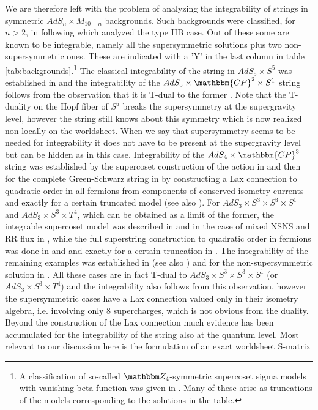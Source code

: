 \documentclass[a4paper,11pt]{article}
\begin{document}
We are therefore left with the problem of analyzing the integrability of strings in symmetric $AdS_n\times M_{10-n}$ backgrounds. Such backgrounds were classified, for $n>2$, in \cite{Wulff:2017zbl} following \cite{Figueroa-OFarrill:2012whx} which analyzed the type IIB case. Out of these some are known to be integrable, namely all the supersymmetric solutions plus two non-supersymmetric ones. These are indicated with a 'Y' in the last column in table \ref{tab:backgrounds}.\footnote{A classification of so-called $\mathbbm Z_4$-symmetric supercoset sigma models with vanishing beta-function was given in \cite{Zarembo:2010sg}. Many of these arise as truncations of the models corresponding to the solutions in the table.} The classical integrability of the string in $AdS_5\times S^5$ was established in \cite{Bena:2003wd} and the integrability of the $AdS_5\times\mathbbm{CP}^2\times S^1$ string follows from the observation that it is T-dual to the former \cite{Duff:1998us}. Note that the T-duality on the Hopf fiber of $S^5$ breaks the supersymmetry at the supergravity level, however the string still knows about this symmetry which is now realized non-locally on the worldsheet. When we say that supersymmetry seems to be needed for integrability it does not have to be present at the supergravity level but can be hidden as in this case. Integrability of the $AdS_4\times\mathbbm{CP}^3$ string was established by the supercoset construction of the action in \cite{Arutyunov:2008if,Stefanski:2008ik} and then for the complete Green-Schwarz string \cite{Gomis:2008jt} in \cite{Sorokin:2010wn} by constructing a Lax connection to quadratic order in all fermions from components of conserved isometry currents and exactly for a certain truncated model (see also \cite{Cagnazzo:2011at}). For $AdS_3\times S^3\times S^3\times S^1$ and $AdS_3\times S^3\times T^4$, which can be obtained as a limit of the former, the integrable supercoset model was described in \cite{Babichenko:2009dk} and in the case of mixed NSNS and RR flux in \cite{Cagnazzo:2012se}, while the full superstring construction to quadratic order in fermions was done in \cite{Sundin:2012gc} and \cite{Wulff:2014kja} and exactly for a certain truncation in \cite{Sundin:2013uca}. The integrability of the remaining examples was established in \cite{Wulff:2014kja} (see also \cite{Wulff:2015mwa}) and for the non-supersymmetric solution in \cite{Wulff:2017hzy}. All these cases are in fact T-dual to $AdS_3\times S^3\times S^3\times S^1$ (or $AdS_3\times S^3\times T^4$) and the integrability also follows from this observation, however the supersymmetric cases have a Lax connection valued only in their isometry algebra, i.e. involving only 8 supercharges, which is not obvious from the duality. Beyond the construction of the Lax connection much evidence has been accumulated for the integrability of the string also at the quantum level. Most relevant to our discussion here is the formulation of an exact worldsheet S-matrix 
\end{document}
